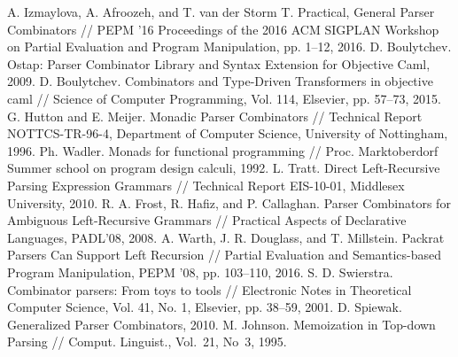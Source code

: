 \begin{thebibliography}{99}
	 A. Izmaylova, A. Afroozeh, and T. van der Storm T. Practical, General Parser Combinators // PEPM '16 Proceedings of the 2016 ACM SIGPLAN Workshop on Partial Evaluation and Program Manipulation, pp. 1--12, 2016.
	 D. Boulytchev. Ostap: Parser Combinator Library and Syntax Extension for Objective Caml, 2009.
	 D. Boulytchev. Combinators and Type-Driven Transformers in objective caml // Science of Computer Programming, Vol. 114, Elsevier, pp. 57--73, 2015.
	 G. Hutton and E. Meijer. Monadic Parser Combinators // Technical Report NOTTCS-TR-96-4, Department of Computer Science, University of Nottingham, 1996.
	 Ph. Wadler. Monads for functional programming // Proc. Marktoberdorf Summer school on program design calculi, 1992.
	 L. Tratt. Direct Left-Recursive Parsing Expression Grammars // Technical Report EIS-10-01, Middlesex University, 2010.
	 R. A. Frost, R. Hafiz, and P. Callaghan. Parser Combinators for Ambiguous Left-Recursive Grammars // Practical Aspects of Declarative Languages, PADL’08, 2008.
	 A. Warth, J. R. Douglass, and T. Millstein. Packrat Parsers Can Support Left Recursion // Partial Evaluation and Semantics-based Program Manipulation, PEPM ’08, pp. 103--110, 2016.
	 S. D. Swierstra. Combinator parsers: From toys to tools // Electronic Notes in Theoretical Computer Science, Vol. 41, No. 1, Elsevier, pp. 38--59, 2001.
	 D. Spiewak. Generalized Parser Combinators, 2010.
	 M. Johnson. Memoization in Top-down Parsing // Comput. Linguist., Vol.~21, No~3, 1995.
\end{thebibliography}
